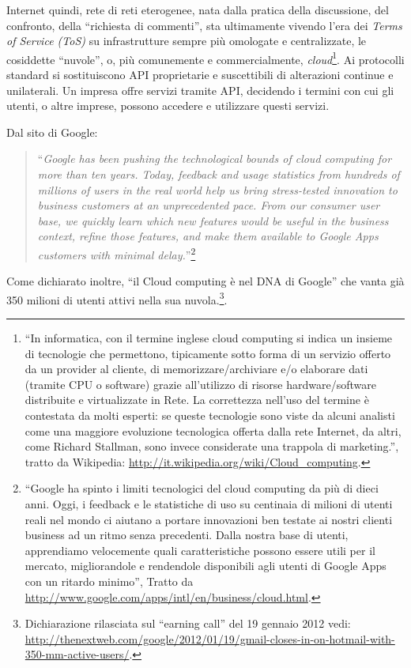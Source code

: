 Internet quindi, rete di reti eterogenee, nata dalla pratica della
discussione, del confronto, della ``richiesta di commenti'', sta
ultimamente vivendo l'era dei \emph{Terms of Service (ToS)} su
infrastrutture sempre più omologate e centralizzate, le cosiddette
``nuvole'', o, più comunemente e commercialmente,
\emph{cloud}\footnote{``In informatica, con il termine inglese cloud
  computing si indica un insieme di tecnologie che permettono,
  tipicamente sotto forma di un servizio offerto da un provider al
  cliente, di memorizzare/archiviare e/o elaborare dati (tramite CPU o
  software) grazie all'utilizzo di risorse hardware/software
  distribuite e virtualizzate in Rete.  La correttezza nell'uso del
  termine è contestata da molti esperti: se queste tecnologie sono
  viste da alcuni analisti come una maggiore evoluzione tecnologica
  offerta dalla rete Internet, da altri, come Richard Stallman, sono
  invece considerate una trappola di marketing.'', tratto da
  Wikipedia: \url{http://it.wikipedia.org/wiki/Cloud_computing}.}. Ai
protocolli standard si sostituiscono API proprietarie e suscettibili
di alterazioni continue e unilaterali. Un impresa offre servizi
tramite API, decidendo i termini con cui gli utenti, o altre imprese,
possono accedere e utilizzare questi servizi.

Dal sito di Google:
\begin{quote}
  ``\emph{Google has been pushing the technological bounds of cloud
  computing for more than ten years. Today, feedback and usage
  statistics from hundreds of millions of users in the real world help
  us bring stress-tested innovation to business customers at an
  unprecedented pace. From our consumer user base, we quickly learn
  which new features would be useful in the business context, refine
  those features, and make them available to Google Apps customers
  with minimal delay.}''\footnote{``Google ha spinto i limiti
    tecnologici del cloud computing da più di dieci anni. Oggi, i
    feedback e le statistiche di uso su centinaia di milioni di utenti
    reali nel mondo ci aiutano a portare innovazioni ben testate ai
    nostri clienti business ad un ritmo senza precedenti. Dalla nostra
    base di utenti, apprendiamo velocemente quali caratteristiche
    possono essere utili per il mercato, migliorandole e rendendole
    disponibili agli utenti di Google Apps con un ritardo minimo'',
    Tratto da
    \url{http://www.google.com/apps/intl/en/business/cloud.html}.}
\end{quote}

Come dichiarato inoltre, ``il Cloud computing è nel DNA di Google''
che vanta già 350 milioni di utenti attivi nella sua
nuvola.\footnote{Dichiarazione rilasciata sul ``earning call'' del 19
  gennaio 2012 vedi:
  \url{http://thenextweb.com/google/2012/01/19/gmail-closes-in-on-hotmail-with-350-mm-active-users/}.}.

